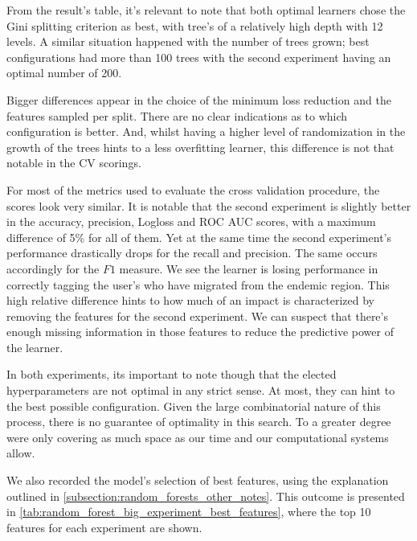 From the result's table, it's relevant to note that both optimal learners chose the Gini splitting criterion as best, with tree's of a relatively high depth with 12 levels.
A similar situation happened with the number of trees grown; best configurations had more than 100 trees with the second experiment having an optimal number of 200.

Bigger differences appear in the choice of the minimum loss reduction and the features sampled per split.
There are no clear indications as to which configuration is better.
And, whilst having a higher level of randomization in the growth of the trees hints to a less overfitting learner, this difference is not that notable in the CV scorings.

For most of the metrics used to evaluate the cross validation procedure, the scores look very similar.
It is notable that the second experiment is slightly better in the accuracy, precision, Logloss and ROC AUC scores, with a maximum difference of 5\% for all of them.
Yet at the same time the second experiment's performance drastically drops for the recall and precision.
The same occurs accordingly for the $F1$ measure.
We see the learner is losing performance in correctly tagging the user's who have migrated from the endemic region.
This high relative difference hints to how much of an impact is characterized by removing the features for the second experiment.
We can suspect that there's enough missing information in those features to reduce the predictive power of the learner.

In both experiments, its important to note though that the elected hyperparameters are not optimal in any strict sense.
At most, they can hint to the best possible configuration.
Given the large combinatorial nature of this process, there is no guarantee of optimality in this search.
To a greater degree were only covering as much space as our time and our computational systems allow.


We also recorded the model's selection of best features, using the explanation outlined in \cref{subsection:random_forests_other_notes}.
This outcome is presented in \cref{tab:random_forest_big_experiment_best_features}, where the top 10 features for each experiment are shown.

